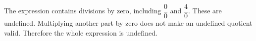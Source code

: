 The expression contains divisions by zero, including $\dfrac{0}{0}$ and $\dfrac{4}{0}$. These are undefined. Multiplying another part by zero does not make an undefined quotient valid. Therefore the whole expression is $\boxed{\text{undefined}}$.
